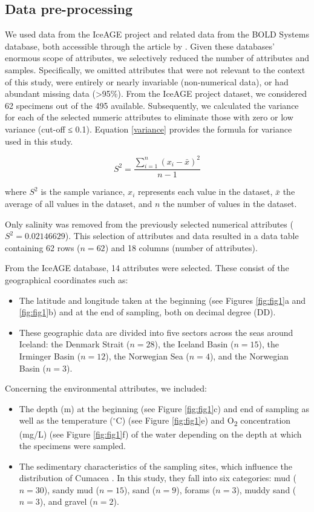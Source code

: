 \subsection{Data pre-processing}
We used data from the IceAGE project and related data from the BOLD Systems database, both accessible through the article by \citep{uhlir_adding_2021}. Given these databases' enormous scope of attributes, we selectively reduced the number of attributes and samples. Specifically, we omitted attributes that were not relevant to the context of this study, were entirely or nearly invariable (non-numerical data), or had abundant missing data (>95\%). From the IceAGE project dataset, we considered 62 specimens out of the 495 available. Subsequently, we calculated the variance for each of the selected numeric attributes to eliminate those with zero or low variance (cut-off ≤ 0.1). Equation \ref{variance} provides the formula for variance used in this study.

\begin{equation}\label{variance}
    S^2 = \frac{\sum_{i=1}^{n} (x_i - \bar{x})^2}{n-1}
\end{equation}

where $S^2$ is the sample variance, $x_i$ represents each value in the dataset, $\bar{x}$ the average of all values in the dataset, and $n$ the number of values in the dataset.

Only salinity was removed from the previously selected numerical attributes ($S^2 = 0.02146629$). This selection of attributes and data resulted in a data table containing 62 rows ($n=62$) and 18 columns (number of attributes). 

From the IceAGE database, 14 attributes were selected. These consist of the geographical coordinates such as: 

\begin{itemize}
\item The latitude and longitude taken at the beginning (see Figures \ref{fig:fig1}a and \ref{fig:fig1}b) and at the end of sampling, both on decimal degree (DD).
\item These geographic data are divided into five sectors across the seas around Iceland: the Denmark Strait ($n=28$), the Iceland Basin ($n=15$), the Irminger Basin ($n=12$), the Norwegian Sea ($n=4$), and the Norwegian Basin ($n=3$). 
\end{itemize}

Concerning the environmental attributes, we included:
\begin{itemize}
\item The depth (m) at the beginning (see Figure \ref{fig:fig1}c) and end of sampling as well as the temperature ($^\circ$C) (see Figure \ref{fig:fig1}e) and O\textsubscript{2} concentration (mg/L) (see Figure \ref{fig:fig1}f) of the water depending on the depth at which the specimens were sampled. 
\item The sedimentary characteristics of the sampling sites, which influence the distribution of Cumacea \citep{uhlir_adding_2021}. In this study, they fall into six categories: mud ($n=30$), sandy mud ($n=15$), sand ($n=9$), forams ($n=3$), muddy sand ($n=3$), and gravel ($n=2$).
\end{itemize}

